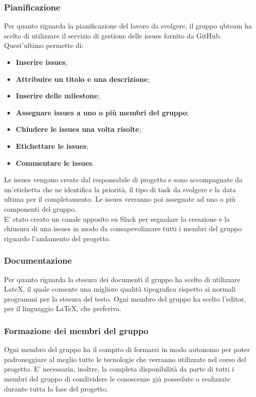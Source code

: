 \subsubsection{Pianificazione}
Per quanto riguarda la pianificazione del lavoro da svolgere, il gruppo qbteam ha scelto di utilizzare 
il servizio di gestione delle issues fornito da GitHub. Quest'ultimo permette di:
\begin{itemize}
\item \textbf{Inserire issues};
\item \textbf{Attribuire un titolo e una descrizione};
\item \textbf{Inserire delle milestone};
\item \textbf{Assegnare issues a uno o più membri del gruppo};
\item \textbf{Chiudere le issues una volta risolte};
\item \textbf{Etichettare le issues};
\item \textbf{Commentare le issues}.
\end{itemize}
Le issues vengono create dal responsabile di progetto e sono accompagnate da un'etichetta che ne identifica la priorità, il tipo di task da svolgere e la data ultima per il completamento. Le issues verranno poi assegnate ad uno o più componenti del gruppo.\\
E' stato creato un canale apposito su Slack per segnalare la creazione e la chiusura di una issues in modo da consapevolizzare tutti i membri del gruppo riguardo l'andamento del progetto.
\subsubsection{Documentazione}
Per quanto riguarda la stesura dei documenti il gruppo ha scelto di utilizzare LateX, il quale consente una migliore qualità tipografica rispetto ai normali programmi per la stesura del testo.
Ogni membro del gruppo ha scelto l'editor, per il linguaggio LaTeX, che preferiva.
\subsubsection{Formazione dei membri del gruppo}
Ogni membro del gruppo ha il compito di formarsi in modo autonomo per poter padroneggiare al meglio tutte le tecnologie che verranno utilizzate nel corso del progetto.
E' necessaria, inoltre, la completa disponibilità da parte di tutti i membri del gruppo di condividere le conoscenze già possedute o realizzate durante tutta la fase del progetto.


